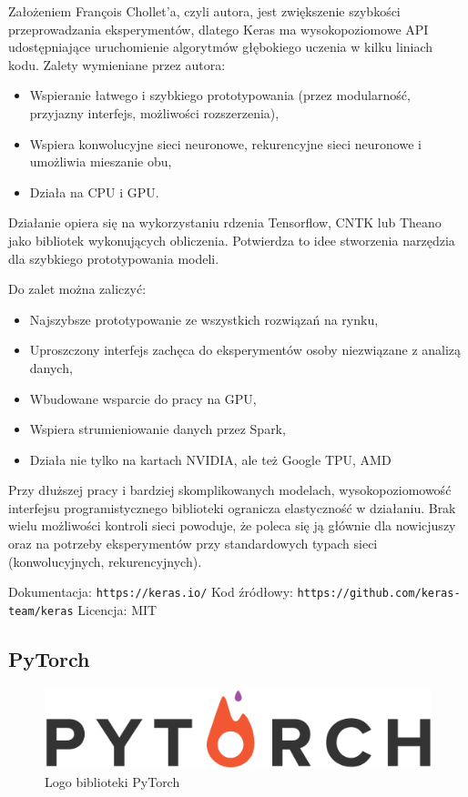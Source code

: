 \documentclass[12pt,a4paper,twoside,titlepage,openright]{book}
\begin{document}
\begin{itemize}
Założeniem François Chollet'a, czyli autora, jest zwiększenie szybkości przeprowadzania eksperymentów, dlatego Keras ma wysokopoziomowe API udostępniające uruchomienie algorytmów głębokiego uczenia w kilku liniach kodu. Zalety wymieniane przez autora:
\begin{itemize}
\item Wspieranie łatwego i szybkiego prototypowania (przez modularność, przyjazny interfejs, możliwości rozszerzenia),
\item Wspiera konwolucyjne sieci neuronowe, rekurencyjne sieci neuronowe i umożliwia mieszanie obu,
\item Działa na CPU i GPU.
\end{itemize}

Działanie opiera się na wykorzystaniu rdzenia Tensorflow, CNTK lub Theano jako bibliotek wykonujących obliczenia. Potwierdza to idee stworzenia narzędzia dla szybkiego prototypowania modeli. \cite{bookDeepLearningKeras}

Do zalet można zaliczyć:
\begin{itemize}
\item Najszybsze prototypowanie ze wszystkich rozwiązań na rynku,
\item Uproszczony interfejs zachęca do eksperymentów osoby niezwiązane z analizą danych,
\item Wbudowane wsparcie do pracy na GPU,
\item Wspiera strumieniowanie danych przez Spark,
\item Działa nie tylko na kartach NVIDIA, ale też Google TPU, AMD
\end{itemize}

Przy dłuższej pracy i bardziej skomplikowanych modelach, wysokopoziomowość interfejsu programistycznego biblioteki ogranicza elastyczność w działaniu. Brak wielu możliwości kontroli sieci powoduje, że poleca się ją głównie dla nowicjuszy oraz na potrzeby eksperymentów przy standardowych typach sieci (konwolucyjnych, rekurencyjnych).

\noindent
\newline 
Dokumentacja: \texttt{https://keras.io/}
\newline 
Kod źródłowy: \texttt{https://github.com/keras-team/keras}
\newline 
Licencja: MIT

\subsection{PyTorch}
\begin{figure}[ht]
	\centering
			\includegraphics[resolution=100, scale=0.5]{PyTorch.png}
		\caption{Logo biblioteki PyTorch}
\end{figure}


\end{itemize}
\end{document}
